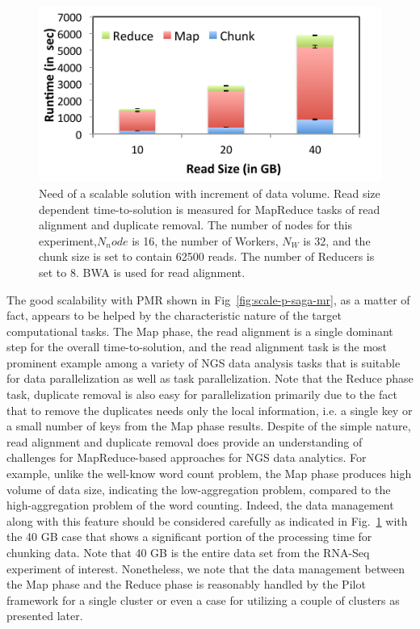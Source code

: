 \documentclass{acm_proc_article-sp}
\begin{document}
 \begin{figure}
 \centering
\includegraphics[scale=0.50]{figures/pj-smr-tts.pdf} 
\caption{\small Need of a scalable solution with increment of data volume.  Read size dependent time-to-solution is measured for MapReduce tasks of read alignment and duplicate removal.  The number of nodes for this experiment,$N_node$ is 16, the number of Workers, $N_W$ is 32, and the chunk size is set to contain 62500 reads.  The number of Reducers is set to 8. BWA is used for read alignment.}
  \label{fig:read-size} 
\end{figure}


The good scalability with PMR shown in Fig~\ref{fig:scale-p-saga-mr}, as a matter of fact, appears to be helped by the characteristic nature of the target computational tasks.  The Map phase, the read alignment is a single dominant step for the overall time-to-solution, and the read alignment task is the most prominent example among a variety of NGS data analysis tasks that is suitable for data parallelization as well as task parallelization.  Note that the Reduce phase task, duplicate removal is also easy for parallelization primarily due to the fact that to remove the duplicates needs only the local information, i.e. a single key or a small number of keys from the Map phase results.  Despite of the simple nature, read alignment and duplicate removal does provide an understanding of challenges for MapReduce-based approaches for NGS data analytics.  For example, unlike the well-know word count problem, the Map phase produces high volume of data size, indicating the low-aggregation problem, compared to the high-aggregation problem of the word counting\cite{weissman-mr-11}.  Indeed, the data management along with this feature should be considered carefully as indicated in Fig.~\ref{fig:read-size} with the 40 GB case that shows a significant portion of the processing time for chunking data.  Note that 40 GB is the entire data set from the RNA-Seq experiment of interest.  Nonetheless, we note that the data management between the Map phase and the Reduce phase is reasonably handled by the Pilot framework for a single cluster or even a case for utilizing a couple of clusters as presented later.
\end{document}
